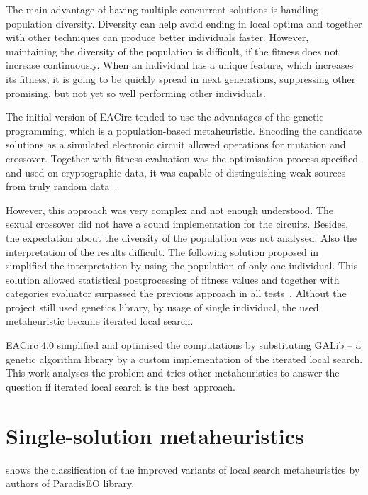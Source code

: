 \documentclass[
  print, %
  Table,   %
  nolof,     %
  nolot,     %
  11pt, %
  oneside  %
]{fithesis3}
\begin{document}
The main advantage of having multiple concurrent solutions is handling population diversity. Diversity can help avoid ending in local optima and together with other techniques can produce better individuals faster. However, maintaining the diversity of the population is difficult, if the fitness does not increase continuously. When an individual has a unique feature, which increases its fitness, it is going to be quickly spread in next generations, suppressing other promising, but not yet so well performing other individuals.

The initial version of EACirc tended to use the advantages of the genetic programming, which is a population-based metaheuristic. Encoding the candidate solutions as a simulated electronic circuit allowed operations for mutation and crossover. Together with fitness evaluation was the optimisation process specified and used on cryptographic data, it was capable of distinguishing weak sources from truly random data~\cite{svenda2013towards}.

However, this approach was very complex and not enough understood. The sexual crossover did not have a sound implementation for the circuits. Besides, the expectation about the diversity of the population was not analysed. Also the interpretation of the results difficult. The following solution proposed in \cite{sys2014constructing} simplified the interpretation by using the population of only one individual. This solution allowed statistical postprocessing of fitness values and together with categories evaluator surpassed the previous approach in all tests~\cite{sys2014constructing}. Althout the project still used genetics library, by usage of single individual, the used metaheuristic became iterated local search.

EACirc 4.0 simplified and optimised the computations by substituting GALib -- a genetic algorithm library by a custom implementation of the iterated local search. This work analyses the problem and tries other metaheuristics to answer the question if iterated local search is the best approach.

\section{Single-solution metaheuristics}
\label{sec:opt-single-sol}

 shows the classification of the improved variants of local search metaheuristics by authors of ParadisEO library.
\end{document}
